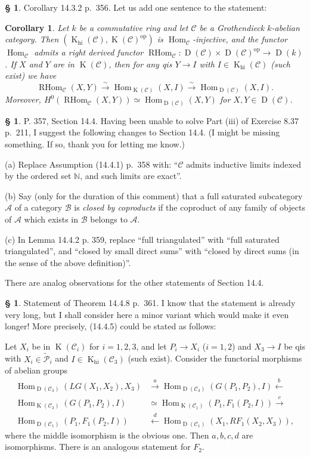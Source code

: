 \documentclass[12pt]{article}
\newtheorem{cor}[thm]{Corollary}
\theoremstyle{remark}
\theoremstyle{definition}
\newtheorem{s}[thm]{\S}
\newcommand{\mc}{\mathcal}
\newcommand{\bb}{\mathbb}
\newcommand{\oo}{\operatorname}
\newcommand{\A}{\mathcal A}
\newcommand{\B}{\mathcal B}
\newcommand{\C}{\mathcal C}
\newcommand{\xr}{\xrightarrow}
\DeclareMathOperator{\Hom}{Hom}%
\DeclareMathOperator{\op}{op}
\begin{document}
%
%
\begin{s}\label{1432b}
Corollary 14.3.2 p.~356. Let us add one sentence to the statement:
%
\begin{cor}\label{1432}
Let $k$ be a commutative ring and let $\C$ be a Grothendieck $k$-abelian category. Then $(\oo K_{\oo{hi}}(\C),\oo K(\C)^{\op})$ is $\Hom_\C$-injective, and the functor $\Hom_\C$ admits a right derived functor $\oo{RHom}_\C:\oo D(\C)\times\oo D(\C)^{\op}\to\oo D(k)$. If $X$ and $Y$ are in $\oo K(\C)$, then for any qis $Y\to I$ with $I\in\oo K_{\oo{hi}}(\C)$ (such exist) we have 
$$
\oo{RHom}_\C(X,Y)\xr\sim\Hom_{\oo K(\C)}(X,I)\xr\sim\Hom_{\oo D(\C)}(X,I).
$$ 
Moreover, $H^0(\oo{RHom}_\C(X,Y))\simeq\Hom_{\oo D(\C)}(X,Y)$ for $X,Y\in\oo D(\C)$.
\end{cor}
\end{s} 
%
%
\begin{s}\label{s144}
P. 357, Section 14.4. Having been unable to solve Part (iii) of Exercise 8.37 p.~211, I suggest the following changes to Section 14.4. (I might be missing something. If so, thank you for letting me know.)

\noindent(a) Replace Assumption (14.4.1) p.~358 with: ``$\C$ admits inductive limits indexed by the ordered set $\bb N$, and such limits are exact''.

\noindent(b) Say (only for the duration of this comment) that a full saturated subcategory $\A$ of a category $\B$ is {\em closed by coproducts} if the coproduct of any family of objects of $\A$ which exists in $\B$ belongs to $\A$.

\noindent(c) In Lemma 14.4.2 p. 359, replace ``full triangulated'' with ``full saturated triangulated'', and ``closed by small direct sums'' with ``closed by direct sums (in the sense of the above definition)''. 

There are analog observations for the other statements of Section 14.4.
\end{s}
%
%
\begin{s}\label{s1448}
Statement of Theorem 14.4.8 p.~361. I know that the statement is already very long, but I shall consider here a minor variant which would make it even longer! More precisely, (14.4.5) could be stated as follows:

Let $X_i$ be in $\oo K(\C_i)$ for $i=1,2,3$, and let $P_i\to X_i$ ($i=1,2$) and $X_3\to I$ be qis with $X_i\in\widetilde{\mc P}_i$ and $I\in\oo K_{\oo{hi}}(\C_3)$ (such exist). Consider the functorial morphisms of abelian groups
\begin{equation}\label{1448}
\begin{split}
\Hom_{\oo D(\C_3)}(LG(X_1,X_2),X_3)&\xr a\Hom_{\oo D(\C_3)}(G(P_1,P_2),I)\xleftarrow b\\ 
\Hom_{\oo K(\C_3)}(G(P_1,P_2),I)&\simeq\Hom_{\oo K(\C_1)}(P_1,F_1(P_2,I))\xr c\\ 
\Hom_{\oo D(\C_1)}(P_1,F_1(P_2,I))&\xleftarrow d\Hom_{\oo D(\C_1)}(X_1,RF_1(X_2,X_3)),
\end{split}
\end{equation}
where the middle isomorphism is the obvious one. Then $a,b,c,d$ are isomorphisms. There is an analogous statement for $F_2$.
\end{s}
\end{document}
